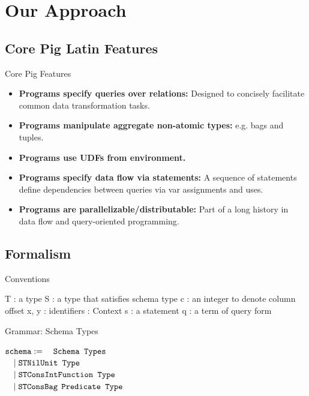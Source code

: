 \section{Our Approach}

\subsection{Core Pig Latin Features}
\begin{frame}{Core Pig Features}
\begin{itemize}
	\item \textbf{Programs specify queries over relations:} Designed to
	concisely facilitate common data transformation tasks.
	\item \textbf{Programs manipulate aggregate non-atomic types:} e.g. bags
	and tuples.
	\item \textbf{Programs use UDFs from environment.}
	\item \textbf{Programs specify data flow via statements:} A sequence of
	statements define dependencies between queries via var assignments and uses.
	\item \textbf{Programs are parallelizable/distributable:} Part of a long
	history in data flow and query-oriented programming.
\end{itemize}
\end{frame}

\subsection{Formalism}
\begin{frame}{Conventions}
\centering
	\begin{flushleft}
		T \quad : a type\newline
		S \quad : a type that satisfies schema type\newline
		c \quad : an integer to denote column offset\newline
		x, y : identifiers\newline
		\textGamma \quad : Context\newline
 		s \quad : a statement\newline
 		q \quad : a term of query form\newline 
	\end{flushleft}
\end{frame}

\begin{frame}{Grammar: Schema Types}
\centering
	\begin{flushleft}
	$ \texttt{schema} := \hfill \quad\texttt{Schema Types}\hfill$\\
	$ \quad \mid \texttt{STNil}\hfill \texttt{{Unit Type}}\hfill$\\
   	$ \quad \mid \texttt{STConsInt} \hfill \texttt{Function Type}\hfill$\\
    $ \quad \mid \texttt{STConsBag} \hfill \:\:\texttt{Predicate Type}\hfill$\\
	\end{flushleft}
\end{frame}

